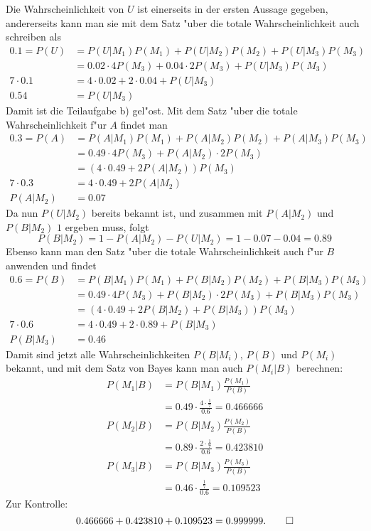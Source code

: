 \begin{loesung}
Die Wahrscheinlichkeit von $U$ ist einerseits in der ersten Aussage
gegeben, andererseits kann man sie mit dem Satz "uber die totale
Wahrscheinlichkeit auch schreiben als
\begin{align*}
0.1=P(U)
&=P(U|M_1)P(M_1)+P(U|M_2)P(M_2)+P(U|M_3)P(M_3)
\\
&=0.02\cdot 4P(M_3)+0.04\cdot 2P(M_3)+P(U|M_3)P(M_3)
\\
7\cdot 0.1&=4\cdot 0.02+2\cdot 0.04+P(U|M_3)
\\
0.54&=P(U|M_3)
\end{align*}
Damit ist die Teilaufgabe b) gel"ost.
Mit dem Satz "uber die totale Wahrscheinlichkeit f"ur $A$ findet man
\begin{align*}
0.3=P(A)&=
P(A|M_1)P(M_1)
+
P(A|M_2)P(M_2)
+
P(A|M_3)P(M_3)
\\
&=
0.49\cdot 4P(M_3)
+
P(A|M_2)\cdot 2P(M_3)
\\
&=
(4\cdot 0.49
+
2P(A|M_2))P(M_3)
\\
7\cdot 0.3
&=4\cdot 0.49+2P(A|M_2)
\\
P(A|M_2)&=0.07
\end{align*}
Da nun $P(U|M_2)$ bereits bekannt ist, und zusammen mit $P(A|M_2)$
und $P(B|M_2)$ $1$ ergeben muss, folgt
\[
P(B|M_2)=1-P(A|M_2)-P(U|M_2)=1-0.07-0.04=0.89
\]
Ebenso kann man den Satz "uber die totale Wahrscheinlichkeit auch
f"ur $B$ anwenden und findet
\begin{align*}
0.6=P(B)
&=
P(B|M_1)P(M_1)
+
P(B|M_2)P(M_2)
+
P(B|M_3)P(M_3)
\\
&=
0.49\cdot 4P(M_3)
+
P(B|M_2)\cdot 2P(M_3)
+
P(B|M_3)P(M_3)
\\
&=
(4\cdot 0.49
+
2P(B|M_2)
+
P(B|M_3))P(M_3)
\\
7\cdot 0.6
&=
4\cdot 0.49+2\cdot 0.89 +P(B|M_3)
\\
P(B|M_3)&=0.46
\end{align*}
Damit sind jetzt alle Wahrscheinlichkeiten $P(B|M_i)$, $P(B)$ und
$P(M_i)$ bekannt, und mit dem Satz von Bayes kann man auch $P(M_i|B)$
berechnen:
\begin{align*}
P(M_1|B)&=
P(B|M_1)\frac{P(M_1)}{P(B)}
\\
&=0.49\cdot\frac{4\cdot\frac17}{0.6}
=0.466666
\\
P(M_2|B)&=
P(B|M_2)\frac{P(M_2)}{P(B)}
\\
&=0.89\cdot\frac{2\cdot\frac17}{0.6}
=0.423810
\\
P(M_3|B)&=
P(B|M_3)\frac{P(M_3)}{P(B)}
\\
&=0.46\cdot\frac{\frac17}{0.6}
=0.109523
\end{align*}
Zur Kontrolle:
\[
0.466666+0.423810+0.109523=0.999999.
\qedhere
\]
\end{loesung}

